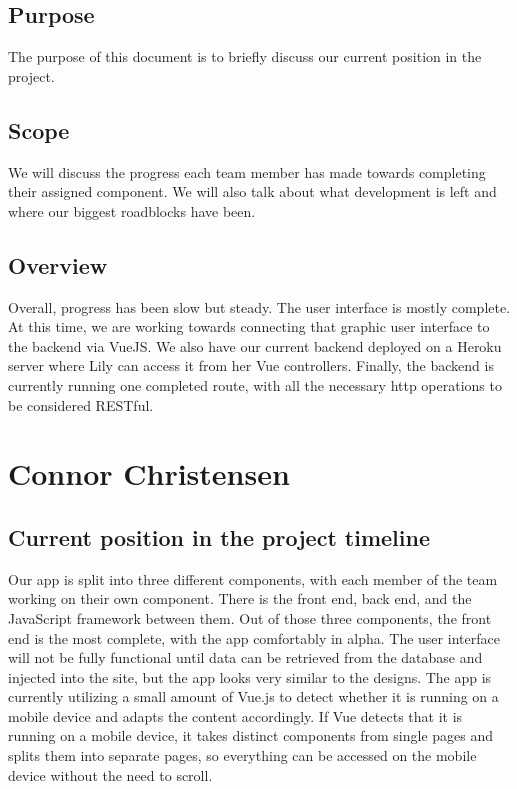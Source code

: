 \documentclass[draftclsnofoot,onecolumn,letterpaper,10pt,compsoc]{IEEEtran}
\begin{document}
\subsection{Purpose}
The purpose of this document is to briefly discuss our current position in the project.

\subsection{Scope}
We will discuss the progress each team member has made towards completing their assigned component.
We will also talk about what development is left and where our biggest roadblocks have been.

\subsection{Overview}
Overall, progress has been slow but steady.
The user interface is mostly complete.
At this time, we are working towards connecting that graphic user interface to the backend via VueJS.
We also have our current backend deployed on a Heroku server where Lily can access it from her Vue controllers.
Finally, the backend is currently running one completed route, with all the necessary http operations to be considered RESTful. 

\section{Connor Christensen}
\subsection{Current position in the project timeline}

Our app is split into three different components, with each member of the team working on their own component. There is the front end, back end, and the JavaScript framework between them.
Out of those three components, the front end is the most complete, with the app comfortably in alpha.
The user interface will not be fully functional until data can be retrieved from the database and injected into the site, but the app looks very similar to the designs.
The app is currently utilizing a small amount of Vue.js to detect whether it is running on a mobile device and adapts the content accordingly.
If Vue detects that it is running on a mobile device, it takes distinct components from single pages and splits them into separate pages, so everything can be accessed on the mobile device without the need to scroll.
\end{document}
